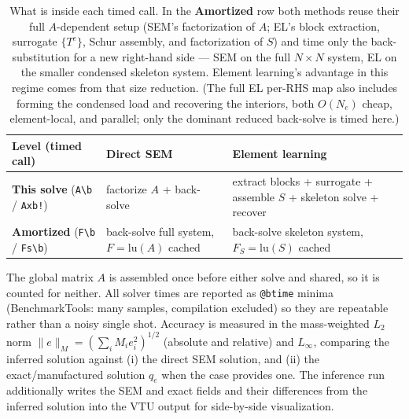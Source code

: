 \documentclass[11pt]{article}
\begin{document}
\begin{table}[h]
\centering
\small
\setlength{\tabcolsep}{4pt}
\begin{tabularx}{\textwidth}{@{}>{\hsize}Y >{\hsize}Y >{\hsize}Y@{}}
\toprule
Level (timed call) & Direct SEM & Element learning \\
\midrule
\textbf{This solve} (\verb|A\b| / \verb|Axb!|) & factorize $A$ + back-solve & extract blocks + surrogate + assemble $S$ + skeleton solve + recover \\[2pt]
\textbf{Amortized} (\verb|F\b| / \verb|Fs\b|) & back-solve full system, $F=\mathrm{lu}(A)$ cached & back-solve skeleton system, $F_S=\mathrm{lu}(S)$ cached \\
\bottomrule
\end{tabularx}
\caption{What is inside each timed call. In the \textbf{Amortized} row both methods
reuse their full $A$-dependent setup (SEM's factorization of $A$; EL's block
extraction, surrogate $\{T^e\}$, Schur assembly, and factorization of $S$) and time
only the back-substitution for a new right-hand side --- SEM on the full $N\times N$
system, EL on the smaller condensed skeleton system. Element learning's advantage in
this regime comes from that size reduction. (The full EL per-RHS map also includes
forming the condensed load and recovering the interiors, both $O(N_e)$ cheap,
element-local, and parallel; only the dominant reduced back-solve is timed here.)}
\label{tab:cost}
\end{table}

\noindent The global matrix $A$ is assembled once before either solve and shared, so it
is counted for neither. All solver times are reported as \texttt{@btime} minima
(BenchmarkTools: many samples, compilation excluded) so they are repeatable rather than
a noisy single shot. Accuracy is measured in the mass-weighted $L_2$ norm
$\|e\|_M=(\sum_i M_i e_i^2)^{1/2}$ (absolute and relative) and $L_\infty$, comparing the
inferred solution against (i) the direct SEM solution, and (ii) the exact/manufactured
solution $q_e$ when the case provides one. The inference run additionally writes the SEM
and exact fields and their differences from the inferred solution into the VTU output for
side-by-side visualization.
\end{document}
